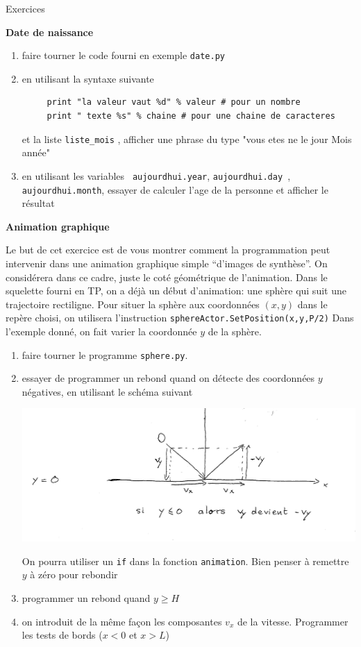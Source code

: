 \documentclass[12pt]{letter}
\begin{document}
\begin{center}
{\Large Exercices  }
\end{center}

\textbf{Date de naissance}
\begin{enumerate}
   \item faire tourner le code fourni en exemple \texttt{date.py}
   \item en utilisant la syntaxe suivante
   \begin{lstlisting}
     print "la valeur vaut %d" % valeur # pour un nombre
     print " texte %s" % chaine # pour une chaine de caracteres
   \end{lstlisting}
   et la liste \texttt{liste\_mois} , afficher une phrase du type "vous etes ne le jour Mois année"
  \item en utilisant les variables \texttt{ aujourdhui.year}, \texttt{aujourdhui.day }, \texttt{aujourdhui.month}, essayer
  de calculer l'age de la personne et afficher le résultat
\end{enumerate}

\textbf{Animation graphique}

 Le but de cet exercice est de vous montrer comment la programmation peut intervenir dans une animation graphique simple ``d'images de synthèse''.
 On considérera dans ce cadre, juste le coté géométrique de l'animation. Dans le squelette fourni en TP, on a déjà un début d'animation: 
 une sphère qui suit une trajectoire rectiligne. 
 Pour situer la sphère aux coordonnées $(x,y)$ dans le repère choisi, on utilisera l'instruction \texttt{sphereActor.SetPosition(x,y,P/2)}
 Dans l'exemple donné, on fait varier la coordonnée $y$ de la sphère. 

 \begin{enumerate} 
 
    \item faire tourner le programme \texttt{sphere.py}. 
    \item essayer de programmer un rebond quand on détecte des coordonnées $y$ négatives, en utilisant le schéma suivant 
   \begin{center}
     \includegraphics[width=0.8\linewidth]{rebond.pdf}
   \end{center}
   On pourra utiliser un \texttt{if} dans la fonction \texttt{animation}. Bien penser à remettre $y$ à zéro pour rebondir
   \item programmer un rebond quand $y \geqslant H$
   \item on introduit de la même façon les composantes $v_x$ de la vitesse. Programmer les tests de bords ($x <0$ et $x > L$)
    
  \end{enumerate}
\end{document}
